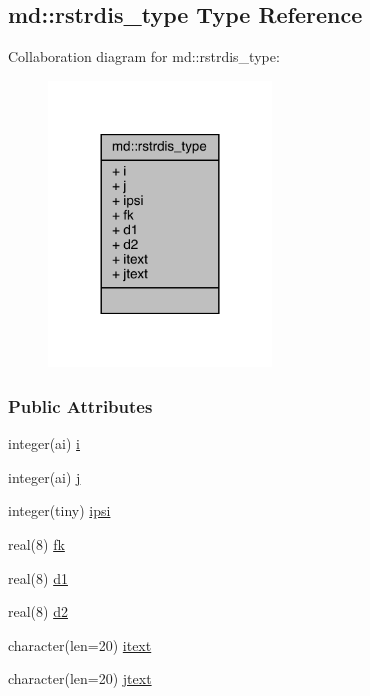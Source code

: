 \hypertarget{structmd_1_1rstrdis__type}{\subsection{md\-:\-:rstrdis\-\_\-type Type Reference}
\label{structmd_1_1rstrdis__type}
}


Collaboration diagram for md\-:\-:rstrdis\-\_\-type\-:
\nopagebreak
\begin{figure}[H]
\begin{center}
\leavevmode
\includegraphics[width=168pt]{structmd_1_1rstrdis__type__coll__graph}
\end{center}
\end{figure}
\subsubsection*{Public Attributes}
\begin{DoxyCompactItemize}
\item 
integer(ai) \hyperlink{structmd_1_1rstrdis__type_acf88055c2b7ebaa7187450015fc82340}{i}
\item 
integer(ai) \hyperlink{structmd_1_1rstrdis__type_a7af40a377e61cf855aba1497c4755f4d}{j}
\item 
integer(tiny) \hyperlink{structmd_1_1rstrdis__type_ad5d682c9991a21ce85aac745c2e0eb3e}{ipsi}
\item 
real(8) \hyperlink{structmd_1_1rstrdis__type_a5a5d01615b17d6df557cf703bf33ab3f}{fk}
\item 
real(8) \hyperlink{structmd_1_1rstrdis__type_a931f1a4becaa30529a171b5269846251}{d1}
\item 
real(8) \hyperlink{structmd_1_1rstrdis__type_a1fc62ab2143ff4a5bf8d2196d23c7320}{d2}
\item 
character(len=20) \hyperlink{structmd_1_1rstrdis__type_a06221ecb25e85a39ebf448493be29936}{itext}
\item 
character(len=20) \hyperlink{structmd_1_1rstrdis__type_a623e91abc941db4679c4b3274db915f4}{jtext}
\end{DoxyCompactItemize}


